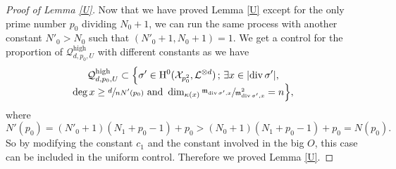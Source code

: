 \documentclass[11pt]{article}
\numberwithin{equation}{section}
\newcommand{\sep}{\,;\,}
\theoremstyle{plain}
\theoremstyle{definition}
\newcommand{\ho}{\mathrm{H}}
\newcommand{\m}{\mathfrak{m}}
\newcommand{\X}{\mathcal{X}}
\newcommand{\li}{\mathcal{L}}
\begin{document}
\begin{proof}[Proof of Lemma \ref{U}]
Now that we have proved Lemma \ref{U} except for the only prime number $p_0$ dividing $N_0+1$, we can run the same process with another constant $N'_0> N_0$ such that $(N'_0+1,N_0+1)=1$. We get a control for the proportion of $\mathcal{Q}_{d,p_0,U}^{\mathrm{high}}$ with different constants as we have
\begin{multline*}
\mathcal{Q}_{d,p_0,U}^{\mathrm{high}}\subset \Bigl\{ \sigma'\in \ho^0(\X_{p_0^2}, \li^{\otimes d})\sep \exists x\in |{\div\sigma'}|,\\[-5pt]\deg x\geq \sfrac{d}{nN'(p_0)}\text{ and } \dim_{\kappa(x)}\sfrac{\m_{\div \sigma',x}}{\m^2_{\div \sigma', x}}=n \Bigr\},
\end{multline*}
where
\[
N'(p_0)=(N'_0+1)(N_1+p_0-1)+p_0>(N_0+1)(N_1+p_0-1)+p_0=N(p_0).
\]
So by modifying the constant $c_1$ and the constant involved in the big $O$, this case can be included in the uniform control. Therefore we proved Lemma \ref{U}.
\end{proof}
\end{document}
